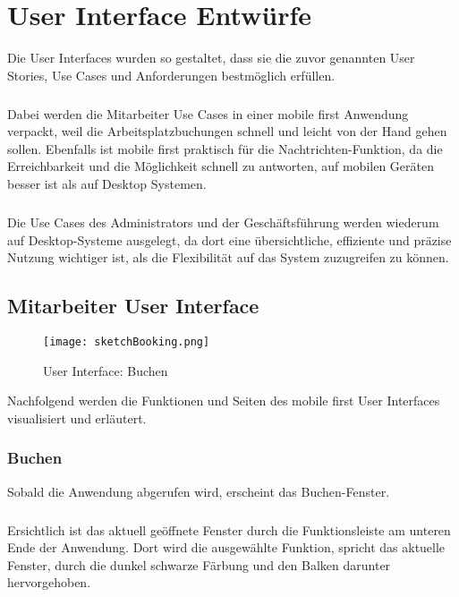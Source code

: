 \chapter{User Interface Entwürfe}

Die User Interfaces wurden so gestaltet, dass sie die zuvor genannten User Stories, Use Cases und Anforderungen bestmöglich erfüllen. 
\paragraph{}Dabei werden die Mitarbeiter Use Cases in einer mobile first Anwendung verpackt, weil die Arbeitsplatzbuchungen schnell und leicht von der Hand gehen sollen.
Ebenfalls ist mobile first praktisch für die Nachtrichten-Funktion, da die Erreichbarkeit und die Möglichkeit schnell zu antworten, auf mobilen Geräten besser ist als auf Desktop Systemen. 
\paragraph{}Die Use Cases des Administrators und der Geschäftsführung werden wiederum auf Desktop-Systeme ausgelegt, da dort eine übersichtliche, effiziente und präzise Nutzung wichtiger ist, als die Flexibilität auf das System zuzugreifen zu können. 

\newpage

\section{Mitarbeiter User Interface}

\begin{wrapfigure}[18]{r}{5.5cm}
  \texttt{[image: sketchBooking.png]}
  \caption{User Interface: Buchen}
\end{wrapfigure}

Nachfolgend werden die Funktionen und Seiten des mobile first User Interfaces visualisiert und erläutert. 

\subsection{Buchen}

Sobald die Anwendung abgerufen wird, erscheint das Buchen-Fenster.
\paragraph{}Ersichtlich ist das aktuell geöffnete Fenster durch die Funktionsleiste am unteren Ende der Anwendung. 
Dort wird die ausgewählte Funktion, spricht das aktuelle Fenster, durch die dunkel schwarze Färbung und den Balken darunter hervorgehoben.

